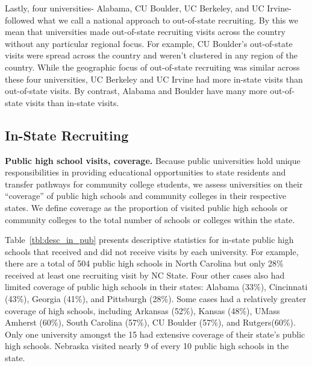\documentclass[twoside]{article}
\begin{document}
Lastly, four universities- Alabama, CU Boulder, UC Berkeley, and UC Irvine- followed what we call a national approach to out-of-state recruiting. By this we mean that universities made out-of-state recruiting visits across the country without any particular regional focus. For example, CU Boulder's out-of-state visits were spread across the country and weren't clustered in any region of the country.  While the geographic focus of out-of-state recruiting was similar across these four universities, UC Berkeley and UC Irvine had more in-state visits than out-of-state visits. By contrast, Alabama and Boulder have many more out-of-state visits than in-state visits.






\subsection*{In-State Recruiting}

\textbf{Public high school visits, coverage.} Because public universities hold unique responsibilities in providing educational opportunities to state residents and transfer pathways for community college students, we assess universities on their ``coverage'' of public high schools and community colleges in their respective states. We define coverage as the proportion of visited public high schools or community colleges to the total number of schools or colleges within the state.

Table~\ref{tbl:desc_in_pub} presents descriptive statistics for in-state public high schools that received and did not receive visits by each university. For example, there are a total of 504 public high schools in North Carolina but only 28\% received at least one recruiting visit by NC State.  Four other cases also had limited coverage of public high schools in their states: Alabama (33\%), Cincinnati (43\%), Georgia (41\%), and Pittsburgh (28\%). Some cases had a relatively greater coverage of high schools, including Arkansas (52\%), Kansas (48\%), UMass Amherst (60\%), South Carolina (57\%), CU Boulder (57\%), and Rutgers(60\%). Only one university amongst the 15 had extensive coverage of their state’s public high schools. Nebraska visited nearly 9 of every 10 public high schools in the state.
\end{document}
